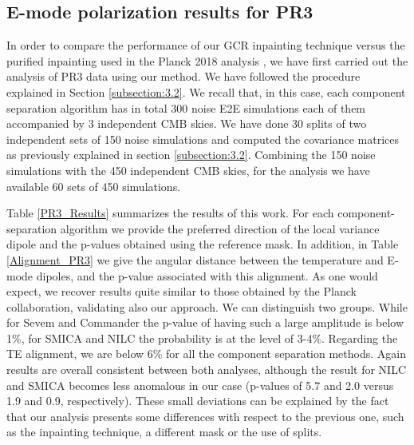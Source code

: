{\subsection{E-mode polarization results for PR3}

In order to compare the performance of our GCR inpainting technique versus the purified inpainting used in the Planck 2018 analysis \cite{Planck:2019evm}, we have first carried out the analysis of PR3 data using our method.
We have followed the procedure explained in Section \ref{subsection:3.2}. We recall that, in this case, each component separation algorithm has in total 300 noise E2E simulations each of them accompanied by 3 independent CMB skies. We have done 30 splits of two independent sets of 150 noise simulations and computed the covariance matrices as previously explained in section \ref{subsection:3.2}. Combining the 150 noise simulations with the 450 independent CMB skies, for the analysis we have available 60 sets of 450 simulations. 

Table \ref{PR3_Results} summarizes the results of this work. For each component-separation algorithm we provide the preferred direction of the local variance dipole and the p-values obtained using the reference mask. In addition, in Table \ref{Alignment_PR3} we give the angular distance between the temperature and E-mode dipoles, and the p-value associated with this alignment. 
As one would expect, we recover results quite similar to those obtained by the Planck collaboration, validating also our approach. We can distinguish two groups. While for Sevem and Commander the p-value of having such a large amplitude is below 1\%, for SMICA and NILC the probability is at the level of 3-4\%. Regarding the TE alignment, we are below 6\% for all the component separation methods. 
Again results are overall consistent between both analyses, although the result for NILC and SMICA becomes less anomalous in our case (p-values of 5.7 and 2.0 versus 1.9 and 0.9, respectively). These small deviations can be explained by the fact that our analysis presents some differences with respect to the previous one, such as the inpainting technique, a different mask or the use of splits.

}
